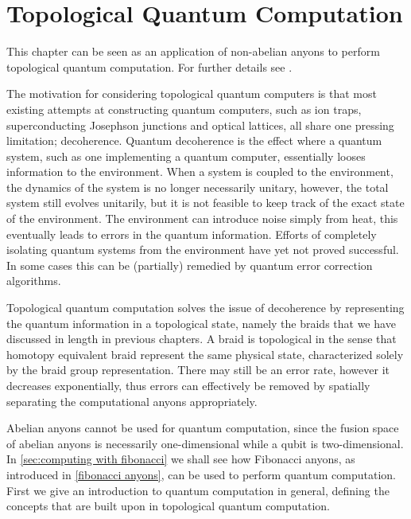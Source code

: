
\chapter{Topological Quantum Computation}\label{chap:tqc}

This chapter can be seen as an application of non-abelian anyons to perform topological quantum computation. For further details see \cite{nayak,freedman kitaev larsen wang,shor fault-tolerant,braid topologies,ainsworth slingerland}.

The motivation for considering topological quantum computers is that most existing attempts at constructing quantum computers, such as ion traps, superconducting Josephson junctions and optical lattices, all share one pressing limitation; decoherence. Quantum decoherence is the effect where a quantum system, such as one implementing a quantum computer, essentially looses information to the environment. When a system is coupled to the environment, the dynamics of the system is no longer necessarily unitary, however, the total system still evolves unitarily, but it is not feasible to keep track of the exact state of the environment. The environment can introduce noise simply from heat, this eventually leads to errors in the quantum information. Efforts of completely isolating quantum systems from the environment have yet not proved successful. In some cases this can be (partially) remedied by quantum error correction algorithms.

Topological quantum computation solves the issue of decoherence by representing the quantum information in a topological state, namely the braids that we have discussed in length in previous chapters. A braid is topological in the sense that homotopy equivalent braid represent the same physical state, characterized solely by the braid group representation. There may still be an error rate, however it decreases exponentially, thus errors can effectively be removed by spatially separating the computational anyons appropriately. \cite{freedman kitaev larsen wang}

Abelian anyons cannot be used for quantum computation, since the fusion space of abelian anyons is necessarily one-dimensional while a qubit is two-dimensional. In \cref{sec:computing with fibonacci} we shall see how Fibonacci anyons, as introduced in \cref{fibonacci anyons}, can be used to perform quantum computation. First we give an introduction to quantum computation in general, defining the concepts that are built upon in topological quantum computation.


